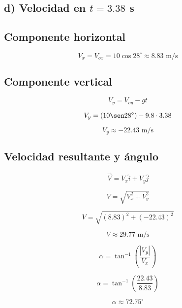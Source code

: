 \subsection{d) Velocidad en $t = 3.38$ s}

\subsection*{Componente horizontal}

\[
V_x = V_{ox} = 10 \cos 28^\circ \approx 8.83 \text{ m/s}
\]

\subsection*{Componente vertical}

\[
V_y = V_{oy} - g t
\]

\[
V_y = (10 \sen 28^\circ) - 9.8 \cdot 3.38
\]

\[
V_y \approx -22.43 \text{ m/s}
\]

\subsection*{Velocidad resultante y ángulo}

\[
\vec{V} = V_x \hat{i} + V_y \hat{j}
\]

\[
V = \sqrt{V_x^2 + V_y^2}
\]

\[
V = \sqrt{(8.83)^2 + (-22.43)^2}
\]

\[
V \approx 29.77 \text{ m/s}
\]

\[
\alpha = \tan^{-1} \left( \frac{|V_y|}{V_x} \right)
\]

\[
\alpha = \tan^{-1} \left( \frac{22.43}{8.83} \right)
\]

\[
\alpha \approx 72.75^\circ
\]





